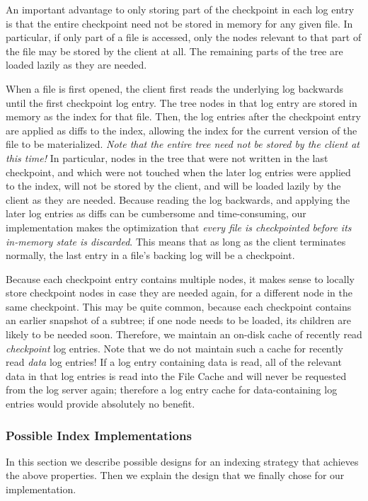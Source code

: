 \documentclass{acm_proc_article-sp}
\begin{document}
An important advantage to only storing part of the checkpoint in each log entry is that the entire checkpoint need not be stored in memory for any given file. In particular, if only part of a file is accessed, only the nodes relevant to that part of the file may be stored by the client at all. The remaining parts of the tree are loaded lazily as they are needed.

When a file is first opened, the client first reads the underlying log backwards until the first checkpoint log entry. The tree nodes in that log entry are stored in memory as the index for that file. Then, the log entries after the checkpoint entry are applied as diffs to the index, allowing the index for the current version of the file to be materialized. \emph{Note that the entire tree need not be stored by the client at this time!} In particular, nodes in the tree that were not written in the last checkpoint, and which were not touched when the later log entries were applied to the index, will not be stored by the client, and will be loaded lazily by the client as they are needed. Because reading the log backwards, and applying the later log entries as diffs can be cumbersome and time-consuming, our implementation makes the optimization that \emph{every file is checkpointed before its in-memory state is discarded}. This means that as long as the client terminates normally, the last entry in a file's backing log will be a checkpoint.

Because each checkpoint entry contains multiple nodes, it makes sense to locally store checkpoint nodes in case they are needed again, for a different node in the same checkpoint. This may be quite common, because each checkpoint contains an earlier snapshot of a subtree; if one node needs to be loaded, its children are likely to be needed soon. Therefore, we maintain an on-disk cache of recently read \emph{checkpoint} log entries. Note that we do not maintain such a cache for recently read \emph{data} log entries! If a log entry containing data is read, all of the relevant data in that log entries is read into the File Cache and will never be requested from the log server again; therefore a log entry cache for data-containing log entries would provide absolutely no benefit.

\subsubsection{Possible Index Implementations}
In this section we describe possible designs for an indexing strategy that achieves the above properties. Then we explain the design that we finally chose for our implementation.
\end{document}
